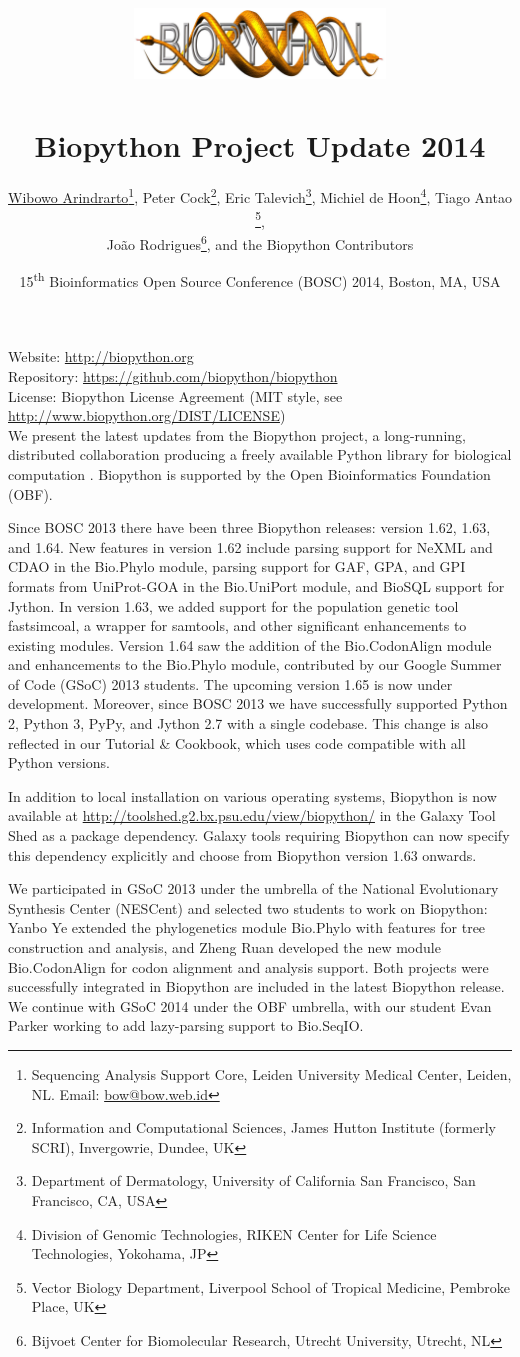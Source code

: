 \documentclass[10pt,oneside]{article}
\title{%
\vspace{-1.5in}
\includegraphics[width=0.5\textwidth]{biopython.jpg}\\
~\\Biopython Project Update 2014}
\author{
    \underline{Wibowo Arindrarto}\footnote{Sequencing Analysis Support Core, Leiden University Medical Center, Leiden, NL. Email: \href{mailto:bow@bow.web.id}{bow@bow.web.id}},
    Peter Cock\footnote{Information and Computational Sciences, James Hutton Institute (formerly SCRI), Invergowrie, Dundee, UK},
    Eric Talevich\footnote{Department of Dermatology, University of California San Francisco, San Francisco, CA, USA},
    Michiel de Hoon\footnote{Division of Genomic Technologies, RIKEN Center for Life Science Technologies, Yokohama, JP},
    Tiago Antao \footnote{Vector Biology Department, Liverpool School of Tropical Medicine, Pembroke Place, UK},
    \\
    Jo\~{a}o Rodrigues\footnote{Bijvoet Center for Biomolecular Research, Utrecht University, Utrecht, NL},
    and the Biopython Contributors}
\date{15\textsuperscript{th} Bioinformatics Open Source Conference (BOSC) 2014, Boston, MA, USA}
\begin{document}
\maketitle
\thispagestyle{empty}

\vspace{-0.2in}
\noindent
Website: \url{http://biopython.org} \\
Repository: \url{https://github.com/biopython/biopython} \\
License: Biopython License Agreement (MIT style, see \url{http://www.biopython.org/DIST/LICENSE}) \\

We present the latest updates from the Biopython project, a long-running,
distributed collaboration producing a freely available Python library for
biological computation \citep{AppNote}. Biopython is supported by the Open
Bioinformatics Foundation (OBF).

Since BOSC 2013 there have been three Biopython releases: version 1.62, 1.63,
and 1.64. New features in version 1.62 include parsing support for NeXML and
CDAO in the Bio.Phylo module, parsing support for GAF, GPA, and GPI formats
from UniProt-GOA in the Bio.UniPort module, and BioSQL support for Jython.
In version 1.63, we added  support for the population genetic tool
fastsimcoal, a wrapper for samtools, and other significant enhancements to
existing modules. Version 1.64 saw the addition of the Bio.CodonAlign module
and enhancements to the Bio.Phylo module, contributed by our Google Summer
of Code (GSoC) 2013 students. The upcoming version 1.65 is now under development.
Moreover, since BOSC 2013 we have successfully supported Python 2, Python 3,
PyPy, and Jython 2.7 with a single codebase. This change is also reflected in
our Tutorial \& Cookbook, which uses code compatible with all Python versions.

In addition to local installation on various operating systems, Biopython
is now available at \url{http://toolshed.g2.bx.psu.edu/view/biopython/}
in the Galaxy Tool Shed \citep{ToolShed} as a package dependency. Galaxy tools
requiring Biopython can now specify this dependency explicitly and choose from
Biopython version 1.63 onwards.

We participated in GSoC 2013 under the umbrella of the National Evolutionary
Synthesis Center (NESCent) and selected two students to work on Biopython:
Yanbo Ye extended the phylogenetics module Bio.Phylo with features for tree
construction and analysis, and Zheng Ruan developed the new module
Bio.CodonAlign for codon alignment and analysis support. Both projects were
successfully integrated in Biopython are included in the latest Biopython
release. We continue with GSoC 2014 under the OBF umbrella, with our student
Evan Parker working to add lazy-parsing support to Bio.SeqIO.
\end{document}
